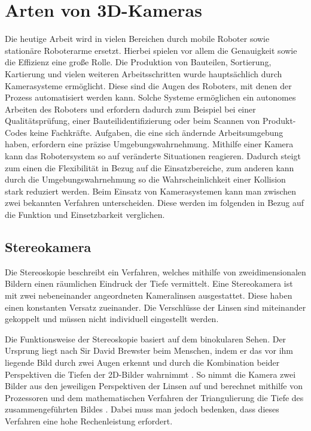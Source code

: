 \section{Arten von 3D-Kameras} \ver
Die heutige Arbeit wird in vielen Bereichen durch mobile Roboter sowie stationäre Roboterarme ersetzt. Hierbei spielen vor allem die Genauigkeit sowie die Effizienz eine große Rolle. Die Produktion von Bauteilen, Sortierung, Kartierung und vielen weiteren Arbeitsschritten wurde hauptsächlich durch Kamerasysteme ermöglicht. Diese sind die Augen des Roboters, mit denen der Prozess automatisiert werden kann. Solche Systeme ermöglichen ein autonomes Arbeiten des Roboters und erfordern dadurch zum Beispiel bei einer Qualitätsprüfung, einer Bauteilidentifizierung oder beim Scannen von Produkt-Codes keine Fachkräfte.
Aufgaben, die eine sich ändernde Arbeitsumgebung haben, erfordern eine präzise Umgebungswahrnehmung. Mithilfe einer Kamera kann das Robotersystem so auf veränderte Situationen reagieren. Dadurch steigt zum einen die Flexibilität in Bezug auf die Einsatzbereiche, zum anderen kann durch die Umgebungswahrnehmung so die Wahrscheinlichkeit einer Kollision stark reduziert werden. Beim Einsatz von Kamerasystemen kann man zwischen zwei bekannten Verfahren unterscheiden. Diese werden im folgenden in Bezug auf die Funktion und Einsetzbarkeit verglichen.

\subsection{Stereokamera}\label{sec:Stereokamera} \ver
Die Stereoskopie beschreibt ein Verfahren, welches mithilfe von zweidimensionalen Bildern einen räumlichen Eindruck der Tiefe vermittelt. Eine Stereokamera ist mit zwei nebeneinander angeordneten Kameralinsen ausgestattet. Diese haben einen konstanten Versatz zueinander. Die Verschlüsse der Linsen sind miteinander gekoppelt und müssen nicht individuell eingestellt werden.

Die Funktionsweise der Stereoskopie basiert auf dem binokularen Sehen. Der Ursprung liegt nach Sir David Brewster beim Menschen, indem er das vor ihm liegende Bild durch zwei Augen erkennt und durch die Kombination beider Perspektiven die Tiefen der 2D-Bilder wahrnimmt \cite{sir_david_brewster_stereoscope_1856}. So nimmt die Kamera zwei Bilder aus den jeweiligen Perspektiven der Linsen auf und berechnet mithilfe von Prozessoren und dem mathematischen Verfahren der Triangulierung die Tiefe des zusammengeführten Bildes \cite{waack_stereofotografie_1979}. Dabei muss man jedoch bedenken, dass dieses Verfahren eine hohe Rechenleistung erfordert.

